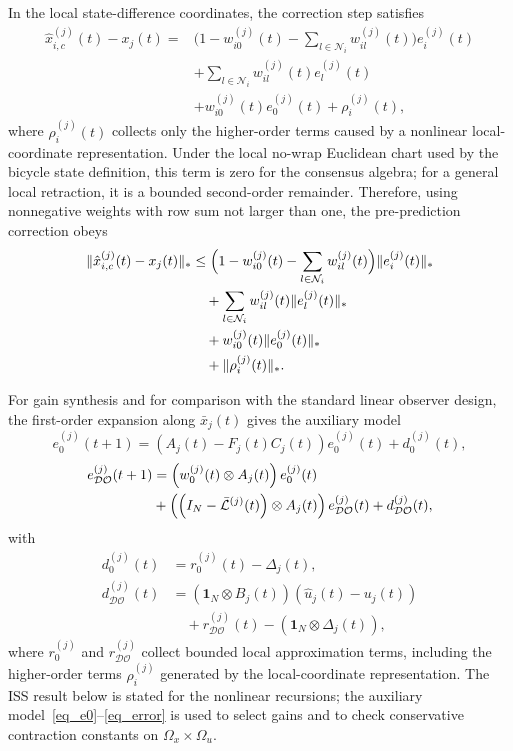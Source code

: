 \documentclass[journal,twoside]{IEEEtran}
\def\L{\mathcal{L}} %
\def\N{\mathcal{N}} %
\def\DO{\mathcal{DO}} %
\begin{document}
In the local state-difference coordinates, the correction step satisfies
\begin{equation}
    \begin{aligned}
\hat{x}_{i,c}^{(j)}(t)-x_j(t)
=&
\Big(1-w_{i0}^{(j)}(t)-\sum_{l\in\N_i}w_{il}^{(j)}(t)\Big)e_i^{(j)}(t)\\
&+
\sum_{l\in\N_i}w_{il}^{(j)}(t)e_l^{(j)}(t)\\
&+w_{i0}^{(j)}(t)e_0^{(j)}(t)+\rho_i^{(j)}(t),
    \end{aligned}
\label{eq:dominant_consensus_error}
\end{equation}
where $\rho_i^{(j)}(t)$ collects only the higher-order terms caused by a nonlinear
local-coordinate representation. Under the local no-wrap Euclidean chart used by
the bicycle state definition, this term is zero for the consensus algebra; for a
general local retraction, it is a bounded second-order remainder. Therefore,
using nonnegative weights with row sum not larger than one, the pre-prediction correction obeys
\begin{align}
\|\hat{x}_{i,c}^{(j)}(t)-x_j(t)\|_*
&\le
\Big(1-w_{i0}^{(j)}(t)-\sum_{l\in\N_i}w_{il}^{(j)}(t)\Big)
\|e_i^{(j)}(t)\|_* \notag\\
&\quad+
\sum_{l\in\N_i}w_{il}^{(j)}(t)\|e_l^{(j)}(t)\|_* \notag\\
&\quad+
w_{i0}^{(j)}(t)\|e_0^{(j)}(t)\|_* \notag\\
&\quad+\|\rho_i^{(j)}(t)\|_* .
\label{eq_nonlinear_consensus_bound}
\end{align}

For gain synthesis and for comparison with the standard linear observer design,
the first-order expansion along $\bar{x}_j(t)$ gives the auxiliary model
\begin{equation}\label{eq_e0}
   e_0^{(j)}(t+1) = \left( A_j(t) - F_{j}(t) C_j(t)  \right) e_0^{(j)}(t) + d_0^{(j)}(t),
\end{equation}
{\small
    \begin{align}\label{eq_error}
        e_{\DO}^{(j)}(t+1) &= \left( w_{0}^{(j)}(t) \otimes A_j(t) \right) e_0^{(j)}(t)  \notag\\
        &+ \left( \left( I_{N} - \bar{\L}^{(j)}(t)  \right)  \otimes  A_j(t) \right) e_{\DO}^{(j)}(t) + d_{\DO}^{(j)}(t),
    \end{align}
}
with
\begin{align*}
    d_0^{(j)}(t) &= r_0^{(j)}(t)- \Delta_j(t), \\
    d_{\DO}^{(j)}(t)  &= (\mathbf{1}_N \otimes B_j(t))(\hat{u}_j(t)-u_j(t)) \\
    &\quad + r_{\DO}^{(j)}(t) - (\mathbf{1}_N \otimes \Delta_j(t)), 
\end{align*}
where $r_0^{(j)}$ and $r_{\DO}^{(j)}$ collect bounded local approximation terms, including the higher-order terms $\rho_i^{(j)}$ generated by the local-coordinate representation. The ISS result below is stated for the nonlinear recursions; the auxiliary model~\eqref{eq_e0}--\eqref{eq_error} is used to select gains and to check conservative contraction constants on $\Omega_x\times\Omega_u$. 
\end{document}
